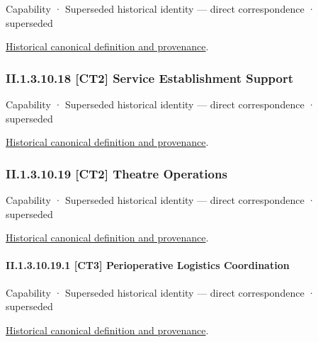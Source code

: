 \label{element:b57081e650f74ad488549fdaa5305bcb}
{\small Capability · Superseded historical identity — direct correspondence · superseded}\par
\href{../../../../continuum/strategy/capability/b57081e650f74ad488549fdaa5305bcb.md}{Historical canonical definition and provenance}.\par
\subsubsection*{II.1.3.10.18 [CT2] Service Establishment Support}
\label{navigation:II.1.3.10.18}

\label{element:8a63b08f34fa42c5bda2a3e12b9ecd55}
{\small Capability · Superseded historical identity — direct correspondence · superseded}\par
\href{../../../../continuum/strategy/capability/8a63b08f34fa42c5bda2a3e12b9ecd55.md}{Historical canonical definition and provenance}.\par
\subsubsection*{II.1.3.10.19 [CT2] Theatre Operations}
\label{navigation:II.1.3.10.19}

\label{element:9ac72fea821c45e2b18632ae9a9867dd}
{\small Capability · Superseded historical identity — direct correspondence · superseded}\par
\href{../../../../continuum/strategy/capability/9ac72fea821c45e2b18632ae9a9867dd.md}{Historical canonical definition and provenance}.\par
\paragraph*{II.1.3.10.19.1 [CT3] Perioperative Logistics Coordination}
\label{navigation:II.1.3.10.19.1}

\label{element:e7813a06b9df462fa135c299261f192e}
{\small Capability · Superseded historical identity — direct correspondence · superseded}\par
\href{../../../../continuum/strategy/capability/e7813a06b9df462fa135c299261f192e.md}{Historical canonical definition and provenance}.\par
